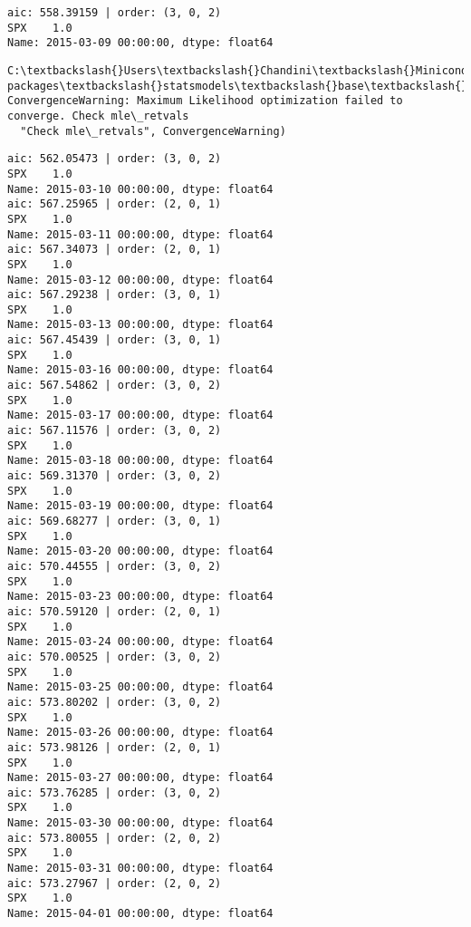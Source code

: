 \documentclass[11pt]{article}
\begin{document}
    \begin{Verbatim}[commandchars=\\\{\}]
aic: 558.39159 | order: (3, 0, 2)
SPX    1.0
Name: 2015-03-09 00:00:00, dtype: float64

    \end{Verbatim}

    \begin{Verbatim}[commandchars=\\\{\}]
C:\textbackslash{}Users\textbackslash{}Chandini\textbackslash{}Miniconda3\textbackslash{}envs\textbackslash{}auquan\textbackslash{}lib\textbackslash{}site-packages\textbackslash{}statsmodels\textbackslash{}base\textbackslash{}model.py:496: ConvergenceWarning: Maximum Likelihood optimization failed to converge. Check mle\_retvals
  "Check mle\_retvals", ConvergenceWarning)

    \end{Verbatim}

    \begin{Verbatim}[commandchars=\\\{\}]
aic: 562.05473 | order: (3, 0, 2)
SPX    1.0
Name: 2015-03-10 00:00:00, dtype: float64
aic: 567.25965 | order: (2, 0, 1)
SPX    1.0
Name: 2015-03-11 00:00:00, dtype: float64
aic: 567.34073 | order: (2, 0, 1)
SPX    1.0
Name: 2015-03-12 00:00:00, dtype: float64
aic: 567.29238 | order: (3, 0, 1)
SPX    1.0
Name: 2015-03-13 00:00:00, dtype: float64
aic: 567.45439 | order: (3, 0, 1)
SPX    1.0
Name: 2015-03-16 00:00:00, dtype: float64
aic: 567.54862 | order: (3, 0, 2)
SPX    1.0
Name: 2015-03-17 00:00:00, dtype: float64
aic: 567.11576 | order: (3, 0, 2)
SPX    1.0
Name: 2015-03-18 00:00:00, dtype: float64
aic: 569.31370 | order: (3, 0, 2)
SPX    1.0
Name: 2015-03-19 00:00:00, dtype: float64
aic: 569.68277 | order: (3, 0, 1)
SPX    1.0
Name: 2015-03-20 00:00:00, dtype: float64
aic: 570.44555 | order: (3, 0, 2)
SPX    1.0
Name: 2015-03-23 00:00:00, dtype: float64
aic: 570.59120 | order: (2, 0, 1)
SPX    1.0
Name: 2015-03-24 00:00:00, dtype: float64
aic: 570.00525 | order: (3, 0, 2)
SPX    1.0
Name: 2015-03-25 00:00:00, dtype: float64
aic: 573.80202 | order: (3, 0, 2)
SPX    1.0
Name: 2015-03-26 00:00:00, dtype: float64
aic: 573.98126 | order: (2, 0, 1)
SPX    1.0
Name: 2015-03-27 00:00:00, dtype: float64
aic: 573.76285 | order: (3, 0, 2)
SPX    1.0
Name: 2015-03-30 00:00:00, dtype: float64
aic: 573.80055 | order: (2, 0, 2)
SPX    1.0
Name: 2015-03-31 00:00:00, dtype: float64
aic: 573.27967 | order: (2, 0, 2)
SPX    1.0
Name: 2015-04-01 00:00:00, dtype: float64

    \end{Verbatim}
\end{document}
